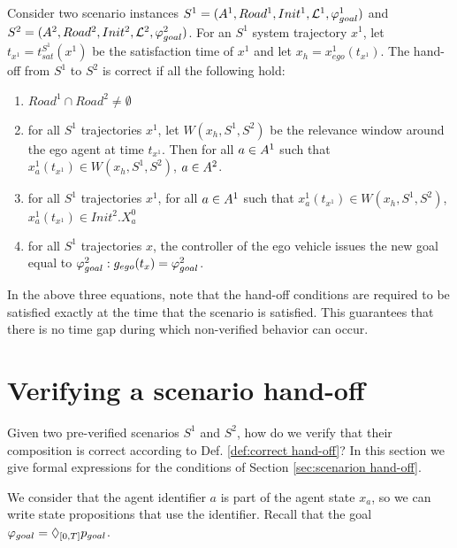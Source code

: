 \begin{defn}
	\label{def:correct hand-off}
Consider two scenario instances $S^1 = (A^1, Road^1, Init^1, \mathcal{L}^1, \varphi_{goal}^1)$
and
$S^2 = (A^2,Road^2, Init^2, \mathcal{L}^2, \varphi_{goal}^2)$.
For an $S^1$ system trajectory $x^1$, let $t_{x^1} = t_{sat}^{S^1}(x^1)$ be the satisfaction time of $x^1$ and let $x_h = x^1_{ego}(t_{x^1})$.
The hand-off from $S^1$ to $S^2$ is correct if all the following hold:
\begin{enumerate}
	\item $Road^1 \cap Road^2 \neq \emptyset$
	\label{hand-off:roads}
	\item for all $S^1$ trajectories $x^1$, let $W(x_h,S^1,S^2)$ be the relevance window around the ego agent at time $t_{x^1}$. Then for all $a \in A^1$ such that $x^1_a(t_{x^1}) \in W(x_h,S^1,S^2)$, $a \in A^2$.
	\label{hand-off:agent survival}
	\item for all $S^1$ trajectories $x^1$, for all $a \in A^1$ such that $x^1_a(t_{x^1}) \in W(x_h,S^1,S^2)$, $x^1_a(t_{x^1}) \in Init^2.X_a^0$
	\label{hand-off:initialization}
	\item for all $S^1$ trajectories $x$, the controller of the ego vehicle issues the new goal equal to $\varphi_{goal}^2: g_{ego}(t_x) = \varphi_{goal}^2$.
	\label{hand-off:new goal}
\end{enumerate}

\end{defn}
In the above three equations, note that the hand-off conditions are required to be satisfied exactly at the time that the scenario is satisfied.
This guarantees that there is no time gap during which non-verified behavior can occur.



\section{Verifying a scenario hand-off}
\label{sec:verifying hand-off}
Given two pre-verified scenarios $S^1$ and $S^2$, how do we verify that their composition is correct according to Def. \ref{def:correct hand-off}?
In this section we give formal expressions for the conditions of Section \ref{sec:scenarion hand-off}.

We consider that the agent identifier $a$ is part of the agent state $x_a$, so we can write state propositions that use the identifier.
Recall that the goal $\varphi_{goal} = \Diamond_{[0,T]}p_{goal}$.

